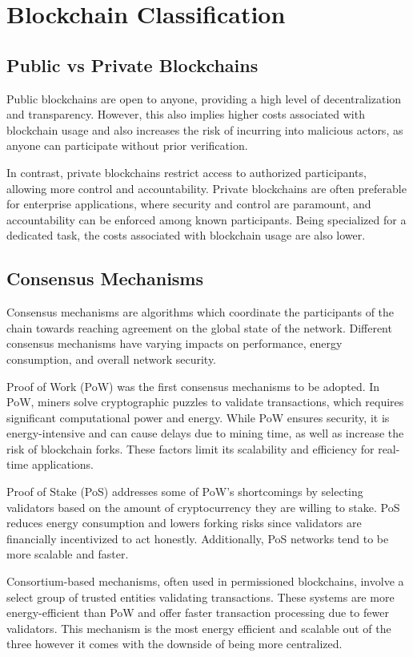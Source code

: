 \section{Blockchain Classification}\label{sec:blockchain-classification}
\subsection{Public vs Private Blockchains}
Public blockchains are open to anyone, providing a high level of decentralization and
transparency. However, this also implies higher costs associated with blockchain usage and also
increases the risk of incurring into malicious actors, as anyone can participate without prior verification.

In contrast, private blockchains restrict access to authorized participants, allowing more control and accountability.
Private blockchains are often preferable for enterprise applications, where security and control
are paramount, and accountability can be enforced among known participants. Being specialized for a dedicated task,
the costs associated with blockchain usage are also lower.

\subsection{Consensus Mechanisms}\label{sec:consensus}
Consensus mechanisms are algorithms which coordinate the participants of the chain towards reaching agreement
on the global state of the network. Different consensus mechanisms have varying impacts on performance,
energy consumption, and overall network security.

Proof of Work (PoW) was the first consensus mechanisms to be adopted. In PoW, miners
solve cryptographic puzzles to validate transactions, which requires significant computational power and
energy. While PoW ensures security, it is energy-intensive and can cause delays due to mining time, as well
as increase the risk of blockchain forks. These factors limit its scalability and efficiency for real-time applications.

Proof of Stake (PoS) addresses some of PoW's shortcomings by selecting validators based on the amount of
cryptocurrency they are willing to stake. PoS reduces energy consumption and lowers forking risks since
validators are financially incentivized to act honestly. Additionally, PoS networks tend to be more scalable
and faster.

Consortium-based mechanisms, often used in permissioned blockchains, involve a select group of trusted
entities validating transactions. These systems are more energy-efficient than PoW and offer faster
transaction processing due to fewer validators. This mechanism is the most energy efficient and scalable out
of the three however it comes with the downside of being more centralized.

